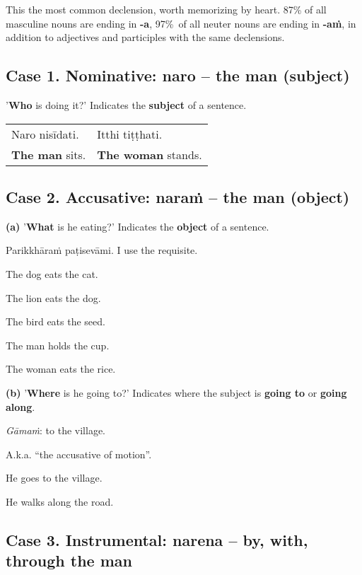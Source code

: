 \documentclass[11pt,oneside]{memoir}
\begin{document}
This the most common declension, worth memorizing by heart. 87\% of all masculine
nouns are ending in \textbf{-a}, \mbox{97\% of} all neuter nouns are ending in \textbf{-aṁ}, in
addition to adjectives and participles with the same declensions.

\clearpage

\subsection{Case 1. Nominative: naro -- the man (subject)}
\label{sec:org499e5cf}

'\textbf{Who} is doing it?' Indicates the \textbf{subject} of a sentence.

\begin{center}
\begin{tabular}{ll}
Naro nisīdati. & Itthi tiṭṭhati.\\[0pt]
\textbf{The man} sits. & \textbf{The woman} stands.\\[0pt]
\end{tabular}
\end{center}

\subsection{Case 2. Accusative: naraṁ -- the man (object)}
\label{sec:org6e72a90}

\textbf{(a)} '\textbf{What} is he eating?' Indicates the \textbf{object} of a sentence.

Parikkhāraṁ paṭisevāmi.
I use the requisite.

The dog eats the cat.

The lion eats the dog.

The bird eats the seed.

The man holds the cup.

The woman eats the rice.

\textbf{(b)} '\textbf{Where} is he going to?' Indicates where the subject is \textbf{going to} or \textbf{going along}.

\emph{Gāmaṁ}: to the village.

A.k.a. ``the accusative of motion''.

He goes to the village.

He walks along the road.

\subsection{Case 3. Instrumental: narena -- by, with, through the man}
\label{sec:org4b09087}
\end{document}
